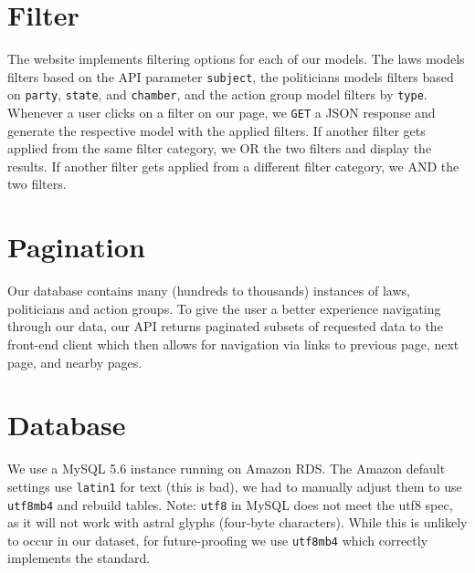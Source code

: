 \documentclass[12pt]{article}
\newcommand{\code}[1]{\texttt{#1}}
\begin{document}
\section{Filter}

The website implements filtering options for each of our models. The laws models filters based on the API parameter \code{subject}, the politicians models filters based on \code{party}, \code{state}, and \code{chamber}, and the action group model filters by \code{type}. Whenever a user clicks on a filter on our page, we \code{GET} a JSON response and generate the respective model with the applied filters. If another filter gets applied from the same filter category, we OR the two filters and display the results. If another filter gets applied from a different filter category, we AND the two filters. 

\section{Pagination}

Our database contains many (hundreds to thousands) instances of laws, politicians and action groups. To give the user a better experience navigating through our data, our API returns paginated subsets of requested data to the front-end client which then allows for navigation via links to previous page, next page, and nearby pages.

\section{Database}

We use a MySQL 5.6 instance running on Amazon RDS. The Amazon default settings use \code{latin1} for text (this is bad), we had to manually adjust them to use \code{utf8mb4} and rebuild tables. Note: \code{utf8} in MySQL does not meet the utf8 spec, as it will not work with astral glyphs (four-byte characters). While this is unlikely to occur in our dataset, for future-proofing we use \code{utf8mb4} which correctly implements the standard. \pagebreak
\end{document}
